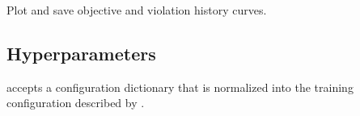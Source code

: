 \documentclass[letterpaper,10pt,english,openany,oneside]{sphinxmanual}
\begin{document}
\begin{fulllineitems}
\begin{fulllineitems}
\end{fulllineitems}


\begin{fulllineitems}
\label{\detokenize{api/package/object:nlpoptnet.api.NLPOptNet.plot_history}}
\pysigstartsignatures
{}
\pysigstopsignatures
\sphinxAtStartPar
Plot and save objective and violation history curves.

\end{fulllineitems}


\end{fulllineitems}


\sphinxstepscope


\subsection{Hyperparameters}
\label{\detokenize{api/package/hyperparameters:hyperparameters}}\label{\detokenize{api/package/hyperparameters::doc}}
\sphinxAtStartPar
{} accepts a configuration dictionary that is normalized into the training configuration described by {\hyperref[\detokenize{api/package/hyperparameters:opt.training.config.TrainConfig}]{}}.
\end{document}
